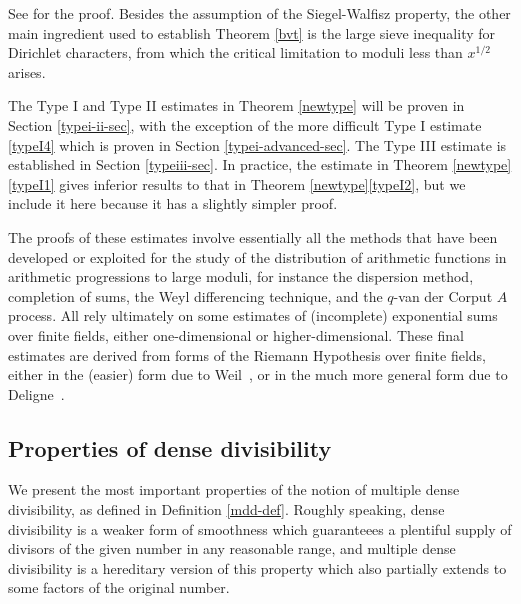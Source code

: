 \documentclass[12pt,a4paper,reqno]{amsart}
\numberwithin{equation}{section}
\theoremstyle{plain}
\theoremstyle{definition}
\begin{document}
See \cite[Theorem 0]{bfi} for the proof. Besides the assumption of the
Siegel-Walfisz property, the other main ingredient used to establish Theorem \ref{bvt} is the large sieve
inequality for Dirichlet characters, from which the critical
limitation to moduli less than $x^{1/2}$ arises.


The Type I and Type II estimates in Theorem \ref{newtype} will be
proven in Section \ref{typei-ii-sec}, with the exception of the more
difficult Type I estimate \eqref{typeI4} which is proven in Section
\ref{typei-advanced-sec}.  The Type III estimate is established in
Section \ref{typeiii-sec}.  In practice, the estimate in Theorem
\ref{newtype}\eqref{typeI1} gives inferior results to that in Theorem
\ref{newtype}\eqref{typeI2}, but we include it here because it has a
slightly simpler proof. 

The proofs of these estimates involve essentially all the methods that
have been developed or exploited for the study of the distribution of
arithmetic functions in arithmetic progressions to large moduli, for
instance the dispersion method, completion of sums, the Weyl
differencing technique, and the $q$-van der Corput $A$ process. All
rely ultimately on some estimates of (incomplete) exponential sums
over finite fields, either one-dimensional or
higher-dimensional. These final estimates are derived from forms of
the Riemann Hypothesis over finite fields, either in the (easier) form
due to Weil~\cite{weilrh}, or in the much more general form due to
Deligne~\cite{WeilII}.



\subsection{Properties of dense divisibility}\label{dhl-mpz-2-proof}

We present the most important properties of the notion of multiple
dense divisibility, as defined in Definition \ref{mdd-def}.  Roughly
speaking, dense divisibility is a weaker form of smoothness which
guaranteees a plentiful supply of divisors of the given number in any
reasonable range, and multiple dense divisibility is a hereditary
version of this property which also partially extends to some factors
of the original number.
\end{document}
